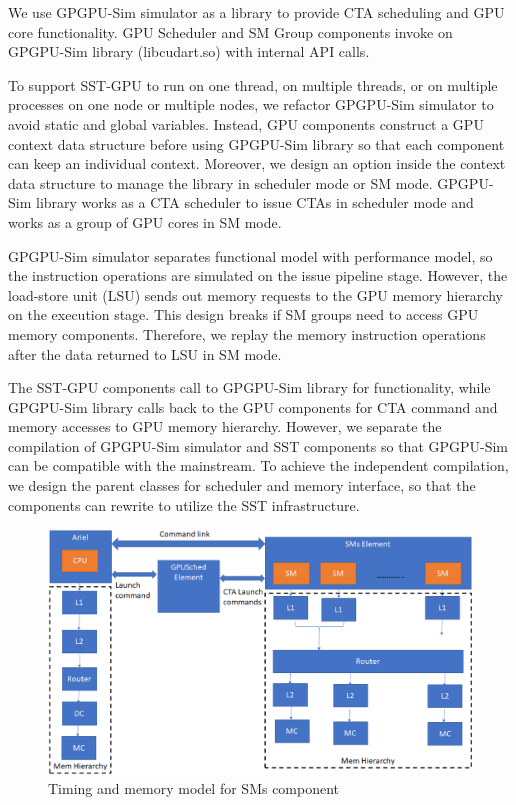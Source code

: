 We use GPGPU-Sim simulator as a library to provide CTA scheduling and GPU core
functionality. GPU Scheduler and SM Group components invoke on GPGPU-Sim library
(libcudart.so) with internal API calls.

To support SST-GPU to run on one thread, on multiple threads, or on multiple
processes on one node or multiple nodes, we refactor GPGPU-Sim simulator to avoid
static and global variables. Instead, GPU components construct a GPU context data
structure before using GPGPU-Sim library so that each component can keep an
individual context. Moreover, we design an option inside the context data structure
to manage the library in scheduler mode or SM mode. GPGPU-Sim library works as
a CTA scheduler to issue CTAs in scheduler mode and works as a group of GPU cores in SM mode.

GPGPU-Sim simulator separates functional model with performance model, so the
instruction operations are simulated on the issue pipeline stage. However, the load-store
unit (LSU) sends out memory requests to the GPU memory hierarchy on the execution stage.
This design breaks if SM groups need to access GPU memory components.
Therefore, we replay the memory instruction operations after the data returned
to LSU in SM mode.

The SST-GPU components call to GPGPU-Sim library for functionality, while
GPGPU-Sim library calls back to the GPU components for CTA command and
memory accesses to GPU memory hierarchy. However, we separate the compilation
of GPGPU-Sim simulator and SST components so that GPGPU-Sim can be compatible
with the mainstream. To achieve the independent compilation, we design the parent
classes for scheduler and memory interface, so that the components can rewrite
to utilize the SST infrastructure.

   \begin{figure}[!htb]
      \centering
      \setlength{\abovecaptionskip}{6pt plus 1pt minus 1pt}
      \includegraphics[width=.90\textwidth,keepaspectratio]{figures/3_1.eps}
      \captionsetup{width=.75\textwidth}
      \caption{Timing and memory model for SMs component}
      \label{fig:gpu_mem_model}
   \end{figure}
